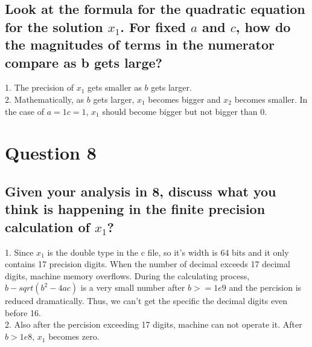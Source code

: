 \documentclass{article}
\begin{document}
\subsection*{Look at the formula for the quadratic equation for the
             solution $x_1$. For fixed $a$ and $c$, how do the magnitudes of
             terms in the numerator compare as b gets large?}

1. The precision of $x_1$ gets smaller as $b$ gets larger.\\
2. Mathematically, as $b$ gets larger, $x_1$ becomes bigger and $x_2$ becomes smaller. In the case of $a=1 c=1$, $x_1$ should become bigger but not bigger than 0.

\section*{Question 8}
\subsection*{Given your analysis in 8, discuss what you think is happening in
             the finite precision calculation of $x_1$?}

1. Since $x_1$ is the double type in the c file, so it's width is 64 bits and it only contains 17 precision digits. When the number of decimal exceeds 17 decimal digits, machine memory overflows. During the calculating process, $b-sqrt(b^2-4ac)$ is a very small number after $b>=1e9$ and the percision is reduced dramatically. Thus, we can't get the specific the decimal digits even before 16.\\ 
2. Also after the percision exceeding 17 digits, machine can not operate it. After $b>1e8$, $x_1$ becomes zero.
\end{document}
